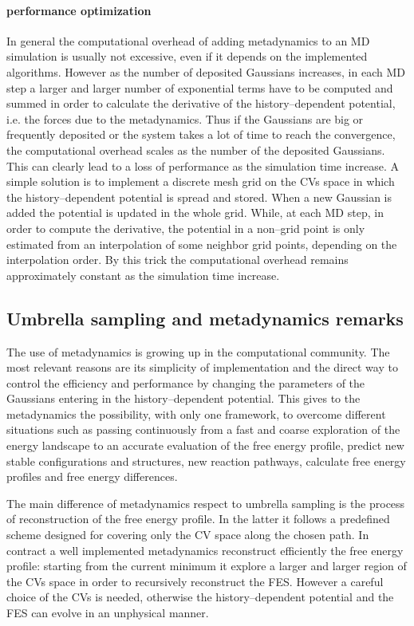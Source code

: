 \paragraph{\textbf{performance optimization}} In general the computational overhead of adding metadynamics to an
\ac{MD} simulation is usually not excessive, even if it depends on the implemented algorithms. However as the
number of deposited Gaussians increases, in each \ac{MD} step a larger and larger number of exponential terms
have to be computed and summed in order to calculate the derivative of the history--dependent potential, i.e. the
forces due to the metadynamics. Thus if the Gaussians are big or frequently deposited or the system takes a lot
of time to reach the convergence, the computational overhead scales as the number of the deposited Gaussians.
This can clearly lead to a loss of performance as the simulation time increase. A simple solution is to implement
a discrete mesh grid on the \acp{CV} space in which the history--dependent potential is spread and stored. When a
new Gaussian is added the potential is updated in the whole grid. While, at each \ac{MD} step, in order to
compute the derivative, the potential in a non--grid point is only estimated from an interpolation of some
neighbor grid points, depending on the interpolation order. By this trick the computational overhead remains
approximately constant as the simulation time increase.

\subsection{Umbrella sampling and metadynamics remarks}
The use of metadynamics is growing up in the computational community. The most relevant reasons are its
simplicity of implementation and the direct way to control the efficiency and performance by changing the
parameters of the Gaussians entering in the history--dependent potential. This gives to the metadynamics the
possibility, with only one framework, to overcome different situations such as passing continuously from a fast
and coarse exploration of the energy landscape to an accurate evaluation of the free energy profile, predict new
stable configurations and structures, new reaction pathways, calculate free energy profiles and free energy
differences.

The main difference of metadynamics respect to umbrella sampling is the process of reconstruction of the free
energy profile. In the latter it follows a predefined scheme designed for covering only the \ac{CV} space along
the chosen path. In contract a well implemented metadynamics reconstruct efficiently the free energy profile:
starting from the current minimum it explore a larger and larger region of the \acp{CV} space in order to
recursively reconstruct the \ac{FES}. However a careful choice of the \acp{CV} is needed, otherwise the
history--dependent potential and the \ac{FES} can evolve in an unphysical manner.

